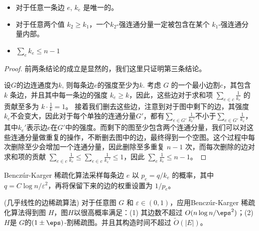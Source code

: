 \begin{lemma}
    \begin{itemize}
        \item 对于任意一条边 $e$, $k_e$ 是唯一的。
        \item 对于任意两个值 $k_2\geq k_1$，一个$k_2$-强连通分量一定被包含在某个 $k_1$-强连通分量内部。
        \item $\sum_e k_e\leq n-1$
    \end{itemize}
\end{lemma}

\begin{proof}
    前两条结论的成立是显然的，我们这里只证明第三条结论。

       设$G$的边连通度为$k$, 则每条边$e$的强度至少为$k$. 考虑 $G$ 的一个最小边割$c$，其包含 $k$ 条边，并且其中每一条边的强度 $k_e\geq k$，因此，这些边对于求和项 $\sum_{e\in c}\frac{1}{k_e}$ 的贡献至多为 $k\cdot \frac{1}{k} = 1$。
    接着我们删去这些边，注意到对于图中剩下的边，其强度$k_e$不会变大，因此对于每个单独的连通分量$G'$，都有$\sum_{e\in G'}\frac{1}{k_e'}$不小于$\sum_{e\in G'}\frac{1}{k_e}$，其中$k_e'$表示边$e$在$G'$中的强度。而剩下的图至少包含两个连通分量，我们可以对这些连通分量做重复的操作，不断删去图中的边，最终得到一个空图。这个过程中每次删除至少会增加一个连通分量，因此删除至多重复 $n-1$ 次，而每次删除的边对求和项的贡献 $\sum_{e\in c}\frac{1}{k_e}\leq\sum_{e\in c}\frac{1}{k_e'}\leq1$，因此 $\sum_{e}\frac{1}{k_e} \leq n-1$。
\end{proof}

Benczúr-Karger 稀疏化算法采样每条边 $e$ 以 $p_e = q/k_e$ 的概率，其中  $q=C\log n/\varepsilon^2$，再将保留下来的边的权重设置为 $1/p_e$。

\begin{theorem}{(几乎线性的边稀疏算法)}
    对于任意图 $G$ 和 $\varepsilon\in(0,1)$，应用Benczúr-Karger 稀疏化算法得到图 $H$，图$H$以很高概率满足：(1) 其边数不超过 $O(n\log n /\eps^2)$；(2) $H$是 $G$的$(1\pm \eps)$-割稀疏图。并且其构造时间不超过 $\widetilde{O}(|E|)$。
\end{theorem}

